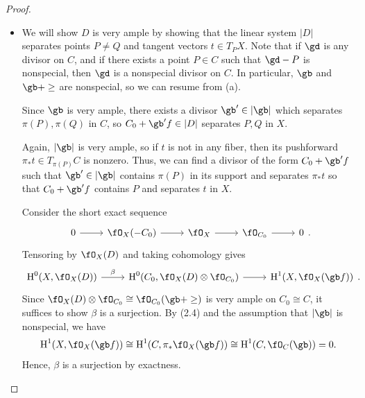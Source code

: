 \documentclass[a4paper]{article}
\begin{document}
\begin{enumerate} [label=\textbf{\arabic*.}, leftmargin=0em]
\begin{proof}
\begin{itemize} [leftmargin=0cm]
                  \item[(b)] We will show $D$ is very ample by showing that the linear system $|D|$ separates points $P \neq Q$ and tangent vectors $t \in T_PX$.
                        Note that if $\gd$ is any divisor on $C$, and if there exists a point $P \in C$ such that $\gd - P$ is nonspecial, then $\gd$ is a nonspecial divisor on $C$.
                        In particular, $\gb$ and $\gb + \ge$ are nonspecial, so we can resume from (a).

                         Since $\gb$ is very ample, there exists a divisor $\gb' \in |\gb|$ which separates $\pi(P), \pi(Q)$ in $C$, so $C_0 + \gb'f \in |D|$ separates $P, Q$ in $X$.

                         Again, $|\gb|$ is very ample, so if $t$ is not in any fiber, then its pushforward $\pi_* t \in T_{\pi(P)}C$ is nonzero.
                        Thus, we can find a divisor of the form $C_0 + \gb' f$ such that $\gb' \in |\gb|$ contains $\pi(P)$ in its support and separates $\pi_* t$ so that  $C_0 + \gb'f$ contains $P$ and separates $t$ in $X$.

                         Consider the short exact sequence
                        \[\begin{tikzcd}
                                0 \arrow[r] & \fO_X(-C_0) \arrow[r] & \fO_X \arrow[r] & \fO_{C_0} \arrow[r] & 0
                            \end{tikzcd}. \]
                        Tensoring by $\fO_X(D)$ and taking cohomology gives
                        \[\begin{tikzcd}
                                \cH^0(X, \fO_X(D)) \arrow[r, "\beta"] & \cH^0(C_0, \fO_X(D) \otimes \fO_{C_0}) \arrow[r] & \cH^1(X, \fO_X(\gb f))
                            \end{tikzcd}. \]
                        Since $\fO_X(D) \otimes \fO_{C_0} \cong \fO_{C_0}(\gb + \ge)$ is very ample on $C_0 \cong C$, it suffices to show $\beta$ is a surjection.
                        By (2.4) and the assumption that $|\gb|$ is nonspecial, we have $$\cH^1(X, \fO_X(\gb f)) \cong \cH^1(C, \pi_* \fO_X(\gb f)) \cong \cH^1(C, \fO_C(\gb)) = 0.$$
                        Hence, $\beta$ is a surjection by exactness.


\end{itemize}
\end{proof}
\end{enumerate}
\end{document}
